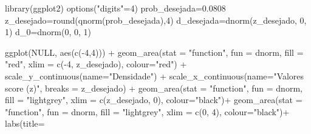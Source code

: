 \documentclass[
]{book}
\newenvironment{Shaded}{\begin{snugshade}}{\end{snugshade}}
\newcommand{\AttributeTok}[1]{\textcolor[rgb]{0.77,0.63,0.00}{#1}}
\newcommand{\ConstantTok}[1]{\textcolor[rgb]{0.00,0.00,0.00}{#1}}
\newcommand{\DecValTok}[1]{\textcolor[rgb]{0.00,0.00,0.81}{#1}}
\newcommand{\FloatTok}[1]{\textcolor[rgb]{0.00,0.00,0.81}{#1}}
\newcommand{\FunctionTok}[1]{\textcolor[rgb]{0.00,0.00,0.00}{#1}}
\newcommand{\NormalTok}[1]{#1}
\newcommand{\OtherTok}[1]{\textcolor[rgb]{0.56,0.35,0.01}{#1}}
\newcommand{\SpecialCharTok}[1]{\textcolor[rgb]{0.00,0.00,0.00}{#1}}
\newcommand{\StringTok}[1]{\textcolor[rgb]{0.31,0.60,0.02}{#1}}
\begin{document}
\begin{Shaded}
\begin{Highlighting}[]
\FunctionTok{library}\NormalTok{(ggplot2)}
\FunctionTok{options}\NormalTok{(}\StringTok{"digits"}\OtherTok{=}\DecValTok{4}\NormalTok{)}
\NormalTok{prob\_desejada}\OtherTok{=}\FloatTok{0.0808}
\NormalTok{z\_desejado}\OtherTok{=}\FunctionTok{round}\NormalTok{(}\FunctionTok{qnorm}\NormalTok{(prob\_desejada),}\DecValTok{4}\NormalTok{)}
\NormalTok{d\_desejada}\OtherTok{=}\FunctionTok{dnorm}\NormalTok{(z\_desejado, }\DecValTok{0}\NormalTok{, }\DecValTok{1}\NormalTok{)}
\NormalTok{d\_0}\OtherTok{=}\FunctionTok{dnorm}\NormalTok{(}\DecValTok{0}\NormalTok{, }\DecValTok{0}\NormalTok{, }\DecValTok{1}\NormalTok{)}

\FunctionTok{ggplot}\NormalTok{(}\ConstantTok{NULL}\NormalTok{, }\FunctionTok{aes}\NormalTok{(}\FunctionTok{c}\NormalTok{(}\SpecialCharTok{{-}}\DecValTok{4}\NormalTok{,}\DecValTok{4}\NormalTok{))) }\SpecialCharTok{+}
  \FunctionTok{geom\_area}\NormalTok{(}\AttributeTok{stat =} \StringTok{"function"}\NormalTok{, }
            \AttributeTok{fun =}\NormalTok{ dnorm, }
            \AttributeTok{fill =} \StringTok{"red"}\NormalTok{, }
            \AttributeTok{xlim =} \FunctionTok{c}\NormalTok{(}\SpecialCharTok{{-}}\DecValTok{4}\NormalTok{, z\_desejado),}
            \AttributeTok{colour=}\StringTok{"red"}\NormalTok{) }\SpecialCharTok{+}
  \FunctionTok{scale\_y\_continuous}\NormalTok{(}\AttributeTok{name=}\StringTok{"Densidade"}\NormalTok{) }\SpecialCharTok{+}
  \FunctionTok{scale\_x\_continuous}\NormalTok{(}\AttributeTok{name=}\StringTok{"Valores score (z)"}\NormalTok{, }\AttributeTok{breaks =}\NormalTok{ z\_desejado) }\SpecialCharTok{+} 
  \FunctionTok{geom\_area}\NormalTok{(}\AttributeTok{stat =} \StringTok{"function"}\NormalTok{,}
            \AttributeTok{fun =}\NormalTok{ dnorm, }
            \AttributeTok{fill =} \StringTok{"lightgrey"}\NormalTok{, }
            \AttributeTok{xlim =} \FunctionTok{c}\NormalTok{(z\_desejado, }\DecValTok{0}\NormalTok{),}
            \AttributeTok{colour=}\StringTok{"black"}\NormalTok{)}\SpecialCharTok{+}
  \FunctionTok{geom\_area}\NormalTok{(}\AttributeTok{stat =} \StringTok{"function"}\NormalTok{,}
            \AttributeTok{fun =}\NormalTok{ dnorm, }
            \AttributeTok{fill =} \StringTok{"lightgrey"}\NormalTok{, }
            \AttributeTok{xlim =} \FunctionTok{c}\NormalTok{(}\DecValTok{0}\NormalTok{, }\DecValTok{4}\NormalTok{),}
            \AttributeTok{colour=}\StringTok{"black"}\NormalTok{)}\SpecialCharTok{+}
  \FunctionTok{labs}\NormalTok{(}\AttributeTok{title=} 

\end{Highlighting}
\end{Shaded}
\end{document}
